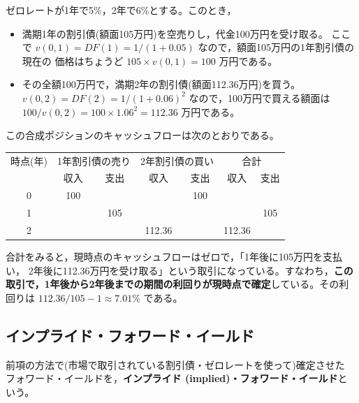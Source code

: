 \begin{example}
ゼロレートが1年で5\%，2年で6\%とする。このとき，
\begin{itemize}
\item 満期1年の割引債(額面105万円)を空売りし，代金100万円を受け取る。
ここで $v(0,1) = DF(1) = 1/(1+0.05)$ なので，額面105万円の1年割引債の現在の
価格はちょうど $105 \times v(0,1) = 100$ 万円である。
\item その全額100万円で，満期2年の割引債(額面112.36万円)を買う。
$v(0,2) = DF(2) = 1/(1+0.06)^2$ なので，100万円で買える額面は
$100/v(0,2) = 100\times 1.06^2 = 112.36$ 万円である。
\end{itemize}
この合成ポジションのキャッシュフローは次のとおりである。
\vspace{0.9em}
\begin{center}
\begin{tabular}{c|cc|cc|cc}
\toprule
時点(年) & \multicolumn{2}{c|}{1年割引債の売り} & \multicolumn{2}{c|}{2年割引債の買い}
& \multicolumn{2}{c}{合計}\\
 & 収入 & 支出 & 収入 & 支出 & 収入 & 支出\\
\midrule
0 & 100 & & & 100 & &\\
1 & & 105 & & & & 105\\
2 & & & 112.36 & & 112.36 &\\
\bottomrule
\end{tabular}
\end{center}
\vspace{0.9em}
合計をみると，現時点のキャッシュフローはゼロで，「1年後に105万円を支払い，
2年後に112.36万円を受け取る」という取引になっている。すなわち，\textbf{この
取引で，1年後から2年後までの期間の利回りが現時点で確定}している。その利回りは
$112.36/105 - 1 \approx 7.01\%$ である。
\end{example}

\vspace{18pt}

\subsection{インプライド・フォワード・イールド}

\begin{definition}
前項の方法で(市場で取引されている割引債・ゼロレートを使って)確定させた
フォワード・イールドを，\textbf{インプライド (implied)・フォワード・イールド}と
いう。
\end{definition}

